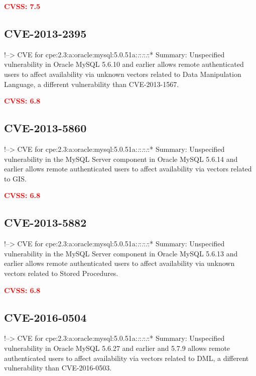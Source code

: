 \documentclass[a4paper, 12pt]{article}
\begin{document}
\textbf{\textcolor{red}{CVSS: 7.5}}

\hypertarget{cve-2013-2395}{%
\subsection{CVE-2013-2395}\label{cve-2013-2395}}

!--\textgreater{} CVE for
cpe:2.3:a:oracle:mysql:5.0.51a:\emph{:}:\emph{:}:\emph{:}:* Summary:
Unspecified vulnerability in Oracle MySQL 5.6.10 and earlier allows
remote authenticated users to affect availability via unknown vectors
related to Data Manipulation Language, a different vulnerability than
CVE-2013-1567.

\textbf{\textcolor{red}{CVSS: 6.8}}

\hypertarget{cve-2013-5860}{%
\subsection{CVE-2013-5860}\label{cve-2013-5860}}

!--\textgreater{} CVE for
cpe:2.3:a:oracle:mysql:5.0.51a:\emph{:}:\emph{:}:\emph{:}:* Summary:
Unspecified vulnerability in the MySQL Server component in Oracle MySQL
5.6.14 and earlier allows remote authenticated users to affect
availability via vectors related to GIS.

\textbf{\textcolor{red}{CVSS: 6.8}}

\hypertarget{cve-2013-5882}{%
\subsection{CVE-2013-5882}\label{cve-2013-5882}}

!--\textgreater{} CVE for
cpe:2.3:a:oracle:mysql:5.0.51a:\emph{:}:\emph{:}:\emph{:}:* Summary:
Unspecified vulnerability in the MySQL Server component in Oracle MySQL
5.6.13 and earlier allows remote authenticated users to affect
availability via unknown vectors related to Stored Procedures.

\textbf{\textcolor{red}{CVSS: 6.8}}

\hypertarget{cve-2016-0504}{%
\subsection{CVE-2016-0504}\label{cve-2016-0504}}

!--\textgreater{} CVE for
cpe:2.3:a:oracle:mysql:5.0.51a:\emph{:}:\emph{:}:\emph{:}:* Summary:
Unspecified vulnerability in Oracle MySQL 5.6.27 and earlier and 5.7.9
allows remote authenticated users to affect availability via vectors
related to DML, a different vulnerability than CVE-2016-0503.
\end{document}

